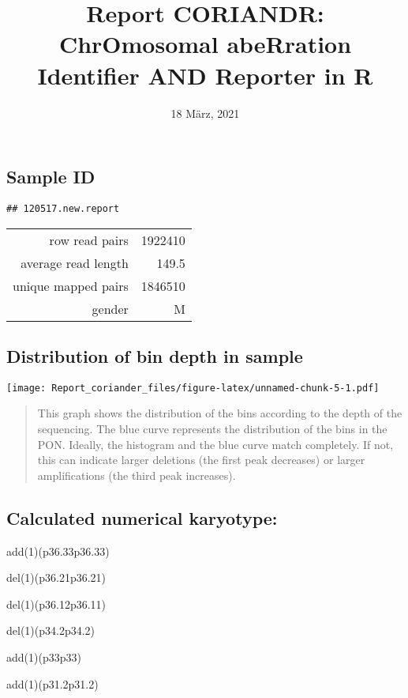 \documentclass[]{article}
\title{Report CORIANDR: ChrOmosomal abeRration Identifier AND Reporter in R}
\author{}
\date{18 März, 2021}
\begin{document}
\maketitle

\hypertarget{sample-id}{%
\subsection{Sample ID}\label{sample-id}}

\begin{verbatim}
## 120517.new.report
\end{verbatim}

\begin{longtable}[]{@{}rr@{}}
\toprule
\endhead
row read pairs & 1922410\tabularnewline
average read length & 149.5\tabularnewline
unique mapped pairs & 1846510\tabularnewline
gender & M\tabularnewline
\bottomrule
\end{longtable}

\hypertarget{distribution-of-bin-depth-in-sample}{%
\subsection{Distribution of bin depth in
sample}\label{distribution-of-bin-depth-in-sample}}

\texttt{[image: Report\_coriander\_files/figure-latex/unnamed-chunk-5-1.pdf]}

\begin{quote}
This graph shows the distribution of the bins according to the depth of
the sequencing. The blue curve represents the distribution of the bins
in the PON. Ideally, the histogram and the blue curve match completely.
If not, this can indicate larger deletions (the first peak decreases) or
larger amplifications (the third peak increases).
\end{quote}

\hypertarget{calculated-numerical-karyotype}{%
\subsection{Calculated numerical
karyotype:}\label{calculated-numerical-karyotype}}

add(1)(p36.33p36.33)

del(1)(p36.21p36.21)

del(1)(p36.12p36.11)

del(1)(p34.2p34.2)

add(1)(p33p33)

add(1)(p31.2p31.2)
\end{document}

